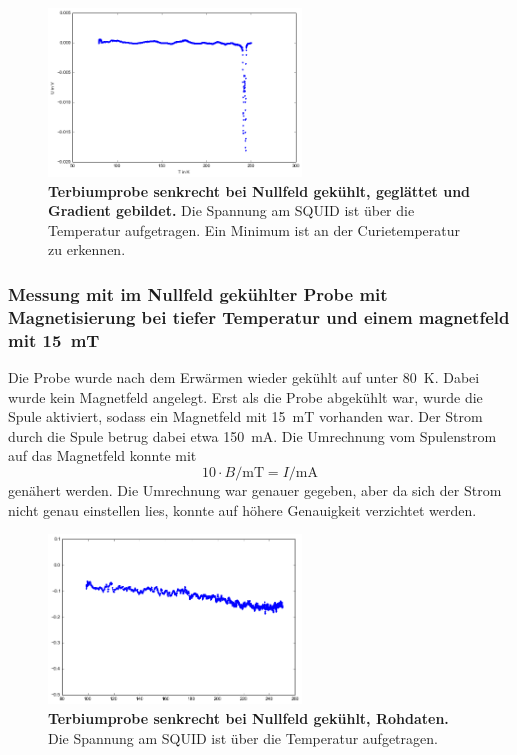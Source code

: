 \documentclass[a4paper,ngerman]{scrartcl}
\begin{document}
\begin{figure}
\centering
\includegraphics[width=0.6\textwidth]{abbildungen/Tb_sr_0_grad.png}
\caption[Terbiumprobe senkrecht bei Nullfeld]{\textbf{Terbiumprobe senkrecht bei Nullfeld gekühlt, geglättet und Gradient gebildet.} Die Spannung am SQUID ist über die Temperatur aufgetragen. Ein Minimum ist an der Curietemperatur zu erkennen.}
\label{fig:Tb_sr_0_grad}
\end{figure}

\subsubsection*{Messung mit im Nullfeld gekühlter Probe mit Magnetisierung bei tiefer Temperatur und einem magnetfeld mit \SI{15}{mT}}

Die Probe wurde nach dem Erwärmen wieder gekühlt auf unter \SI{80}{K}.
Dabei wurde kein Magnetfeld angelegt.
Erst als die Probe abgekühlt war, wurde die Spule aktiviert, sodass ein Magnetfeld mit \SI{15}{mT} vorhanden war.
Der Strom durch die Spule betrug dabei etwa \SI{150}{\mA}.
Die Umrechnung vom Spulenstrom auf das Magnetfeld konnte mit 
\begin{equation}
10 \cdot B/\mathrm{mT} = I /\mathrm{mA}
\end{equation} 
genähert werden. 
Die Umrechnung war genauer gegeben, aber da sich der Strom nicht genau einstellen lies, konnte auf höhere Genauigkeit verzichtet werden.


\begin{figure}
\centering
\includegraphics[width=0.6\textwidth]{abbildungen/Tb_sr_0_mit.png}
\caption[Terbiumprobe senkrecht bei Nullfeld]{\textbf{Terbiumprobe senkrecht bei Nullfeld gekühlt, Rohdaten.} Die Spannung am SQUID ist über die Temperatur aufgetragen.}
\label{fig:Tb_sr_0_mit}
\end{figure}
\end{document}
